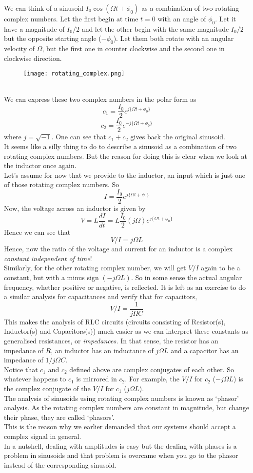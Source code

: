 We can think of a sinusoid $I_0 \cos (\Omega t + \phi_0)$ as a combination of
two rotating complex numbers. Let the first begin at time $t = 0$ with an
angle of $\phi_0$. Let it have a magnitude of $I_0 / 2$ and let the other
begin with the same magnitude $I_0 / 2$ but the opposite starting angle ($-
\phi_0$). Let them both rotate with an angular velocity of $\Omega$, but the
first one in counter clockwise and the second one in clockwise direction.
\begin{figure}[ht]
\centering
\texttt{[image: rotating\_complex.png]}
\end{figure}
\\
We can express these two complex numbers in the polar form as
\[ c_1 = \frac{I_0}{2} e^{j \{ \Omega t + \phi_0 \}} \]
\[ c_2 = \frac{I_0}{2} e^{- j \{ \Omega t + \phi_0 \}} \]
where $j = \sqrt{- 1}$. One can see that $c_1 + c_2$ gives back the original
sinusoid.\\
It seems like a silly thing to do to describe a sinusoid as a combination of
two rotating complex numbers. But the reason for doing this is clear when we
look at the inductor once again.\\
Let's assume for now that we provide to the inductor, an input which is just
one of those rotating complex numbers. So
\[ I = \frac{I_0}{2} e^{j \{ \Omega t + \phi_0 \}} \]
Now, the voltage across an inductor is given by
\[ V = L \frac{d I}{d t} = L\frac{I_0}{2} (j \Omega) e^{j \{ \Omega t +
   \phi_0 \}} \]
Hence we can see that
\[ V / I = j \Omega L \]
Hence, now the ratio of the voltage and current for an inductor is a complex
\textit{constant independent of time}!\\
Similarly, for the other rotating complex number, we will get $V / I$ again to
be a constant, but with a minus sign $(- j \Omega L)$. So in some sense the
actual angular frequency, whether positive or negative, is reflected. It is left as an exercise to do a similar analysis for capacitances and verify that
for capacitors,
\[ V / I = \frac{1}{j \Omega C} \]
This makes the analysis of RLC circuits (circuits consisting of Resistor(s),
Inductor(s) and Capacitors(s)) much easier as we can interpret these constants
as generalised resistances, or \textit{impedances.} In that sense, the
resistor has an impedance of $R$, an inductor has an inductance of $j \Omega
L$ and a capacitor has an impedance of $1 / j \Omega C$.\\
Notice that $c_1$ and $c_2$ defined above are complex conjugates of each
other. So whatever happens to $c_1$ is mirrored in $c_2$. For example, the $V
/ I$ for $c_2$ ($- j \Omega L$) is the complex conjugate of the $V / I$ for
$c_1$ ($j \Omega L$).\\
The analysis of sinusoids using rotating complex numbers is known as `phasor'
analysis. As the rotating complex numbers are constant in magnitude, but
change their phase, they are called `phasors'.\\
This is the reason why we earlier demanded that our systems should accept a
complex signal in general.\\
In a nutshell, dealing with amplitudes is easy but the dealing with phases is
a problem in sinusoids and that problem is overcame when you go to the phasor
instead of the corresponding sinusoid.